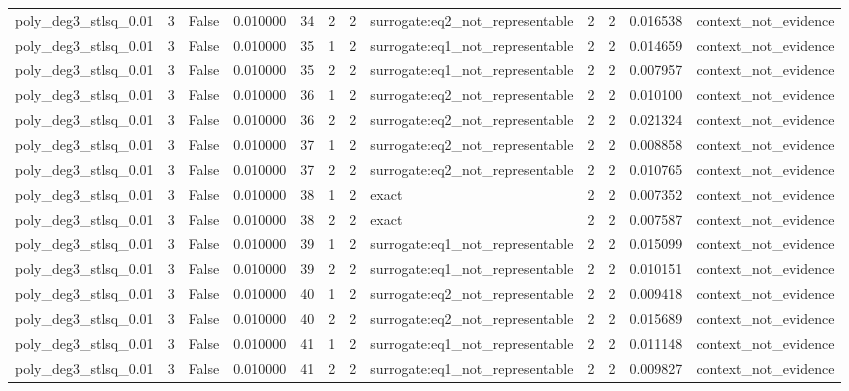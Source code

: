 \begin{tabular}{lrrrrrrlrrrl}
poly\_deg3\_stlsq\_0.01 & 3 & False & 0.010000 & 34 & 2 & 2 & surrogate:eq2\_not\_representable & 2 & 2 & 0.016538 & context\_not\_evidence \\
poly\_deg3\_stlsq\_0.01 & 3 & False & 0.010000 & 35 & 1 & 2 & surrogate:eq1\_not\_representable & 2 & 2 & 0.014659 & context\_not\_evidence \\
poly\_deg3\_stlsq\_0.01 & 3 & False & 0.010000 & 35 & 2 & 2 & surrogate:eq1\_not\_representable & 2 & 2 & 0.007957 & context\_not\_evidence \\
poly\_deg3\_stlsq\_0.01 & 3 & False & 0.010000 & 36 & 1 & 2 & surrogate:eq2\_not\_representable & 2 & 2 & 0.010100 & context\_not\_evidence \\
poly\_deg3\_stlsq\_0.01 & 3 & False & 0.010000 & 36 & 2 & 2 & surrogate:eq2\_not\_representable & 2 & 2 & 0.021324 & context\_not\_evidence \\
poly\_deg3\_stlsq\_0.01 & 3 & False & 0.010000 & 37 & 1 & 2 & surrogate:eq2\_not\_representable & 2 & 2 & 0.008858 & context\_not\_evidence \\
poly\_deg3\_stlsq\_0.01 & 3 & False & 0.010000 & 37 & 2 & 2 & surrogate:eq2\_not\_representable & 2 & 2 & 0.010765 & context\_not\_evidence \\
poly\_deg3\_stlsq\_0.01 & 3 & False & 0.010000 & 38 & 1 & 2 & exact & 2 & 2 & 0.007352 & context\_not\_evidence \\
poly\_deg3\_stlsq\_0.01 & 3 & False & 0.010000 & 38 & 2 & 2 & exact & 2 & 2 & 0.007587 & context\_not\_evidence \\
poly\_deg3\_stlsq\_0.01 & 3 & False & 0.010000 & 39 & 1 & 2 & surrogate:eq1\_not\_representable & 2 & 2 & 0.015099 & context\_not\_evidence \\
poly\_deg3\_stlsq\_0.01 & 3 & False & 0.010000 & 39 & 2 & 2 & surrogate:eq1\_not\_representable & 2 & 2 & 0.010151 & context\_not\_evidence \\
poly\_deg3\_stlsq\_0.01 & 3 & False & 0.010000 & 40 & 1 & 2 & surrogate:eq2\_not\_representable & 2 & 2 & 0.009418 & context\_not\_evidence \\
poly\_deg3\_stlsq\_0.01 & 3 & False & 0.010000 & 40 & 2 & 2 & surrogate:eq2\_not\_representable & 2 & 2 & 0.015689 & context\_not\_evidence \\
poly\_deg3\_stlsq\_0.01 & 3 & False & 0.010000 & 41 & 1 & 2 & surrogate:eq1\_not\_representable & 2 & 2 & 0.011148 & context\_not\_evidence \\
poly\_deg3\_stlsq\_0.01 & 3 & False & 0.010000 & 41 & 2 & 2 & surrogate:eq1\_not\_representable & 2 & 2 & 0.009827 & context\_not\_evidence \\

\end{tabular}
